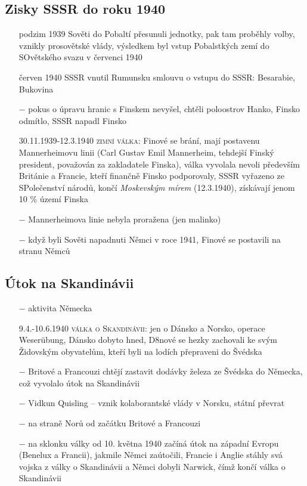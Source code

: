 \documentclass{article}
\begin{document}
\subsection*{Zisky SSSR do roku 1940}
\begin{itemize}
    \vspace{-0.5em}
    \setlength\itemsep{0.15em}
    \item[podzim 1939] Sověti do Pobaltí přesunuli jednotky, pak tam proběhly volby, vznikly prosovětské vlády, výsledkem byl vstup Pobalstkých zemí do SOvětského svazu v červenci 1940
    \item[červen 1940] SSSR vnutil Rumunsku smlouvu o vstupu do SSSR: Besarabie, Bukovina
    \item[$-$] pokus o úpravu hranic s Finskem nevyšel, chtěli poloostrov Hanko, Finsko odmítlo, SSSR napadl Finsko
    \item[30.11.1939-12.3.1940] \textsc{zimní válka}: Finové se brání, mají postavenu Mannerheimovu linii (Carl Gustav Emil Mannerheim, tehdejší Finský president, považován za zakladatele Finska), válka vyvolala nevoli především Británie a Francie, kteří finančně Finsko podporovaly, SSSR vyřazeno ze SPolečenství národů, končí \textit{Moskevským mírem} (12.3.1940), získávají jenom 10 \% území Finska
    \item[$-$] Mannerheimova linie nebyla proražena (jen malinko)
    \item[$-$] když byli Sověti napadnuti Němci v roce 1941, Finové se postavili na stranu Němců
\end{itemize}

\subsection*{Útok na Skandinávii}
\begin{itemize}
    \vspace{-0.5em}
    \setlength\itemsep{0.15em}
    \item[$-$] aktivita Německa
    \item[9.4.-10.6.1940] \textsc{válka o Skandinávii}: jen o Dánsko a Norsko, operace Weserübung, Dánsko dobyto hned, D8nové se hezky zachovali ke svým Židovským obyvatelům, kteří  byli na lodích přepraveni do Švédska
    \item[$-$] Britové a Francouzi chtějí zastavit dodávky železa ze Švédska do Německa, což vyvolalo útok na Skandinávii
    \item[$-$] Vidkun Quisling -- vznik kolaborantské vlády v Norsku, státní převrat
    \item[$-$] na straně Norů od začátku Britové a Francouzi
    \item[$-$] na sklonku války od 10. května 1940 začíná útok na západní Evropu (Benelux a Francii), jakmile Němci zaútočili, Francie i Anglie stáhly svá vojska z války o Skandinávii a Němci dobyli Narwick, čímž končí válka o Skandinávii
\end{itemize}
\end{document}
